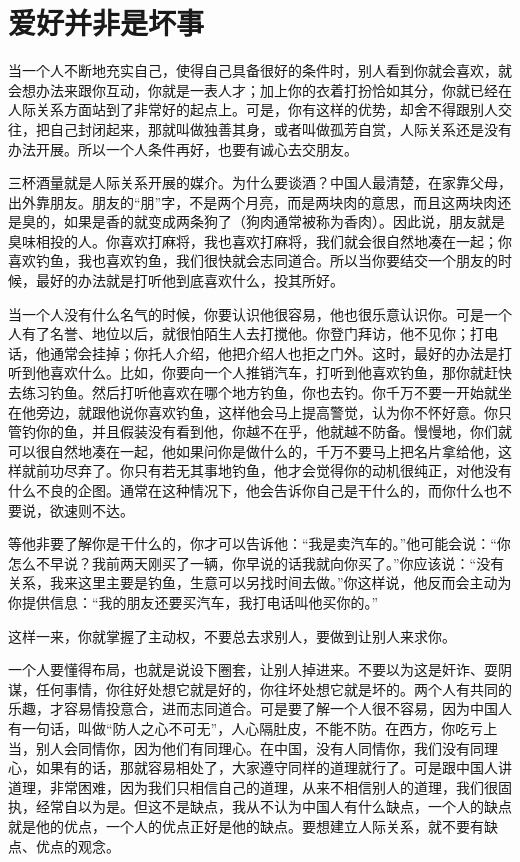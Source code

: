 \documentclass[fontset=fandol, a4paper, 12pt, openright]{ctexbook}
\begin{document}
\section{爱好并非是坏事}

当一个人不断地充实自己，使得自己具备很好的条件时，别人看到你就会喜欢，就会想办法来跟你互动，你就是一表人才；加上你的衣着打扮恰如其分，你就已经在人际关系方面站到了非常好的起点上。可是，你有这样的优势，却舍不得跟别人交往，把自己封闭起来，那就叫做独善其身，或者叫做孤芳自赏，人际关系还是没有办法开展。所以一个人条件再好，也要有诚心去交朋友。

三杯酒量就是人际关系开展的媒介。为什么要谈酒？中国人最清楚，在家靠父母，出外靠朋友。朋友的“朋”字，不是两个月亮，而是两块肉的意思，而且这两块肉还是臭的，如果是香的就变成两条狗了（狗肉通常被称为香肉）。因此说，朋友就是臭味相投的人。你喜欢打麻将，我也喜欢打麻将，我们就会很自然地凑在一起；你喜欢钓鱼，我也喜欢钓鱼，我们很快就会志同道合。所以当你要结交一个朋友的时候，最好的办法就是打听他到底喜欢什么，投其所好。

当一个人没有什么名气的时候，你要认识他很容易，他也很乐意认识你。可是一个人有了名誉、地位以后，就很怕陌生人去打搅他。你登门拜访，他不见你；打电话，他通常会挂掉；你托人介绍，他把介绍人也拒之门外。这时，最好的办法是打听到他喜欢什么。比如，你要向一个人推销汽车，打听到他喜欢钓鱼，那你就赶快去练习钓鱼。然后打听他喜欢在哪个地方钓鱼，你也去钓。你千万不要一开始就坐在他旁边，就跟他说你喜欢钓鱼，这样他会马上提高警觉，认为你不怀好意。你只管钓你的鱼，并且假装没有看到他，你越不在乎，他就越不防备。慢慢地，你们就可以很自然地凑在一起，他如果问你是做什么的，千万不要马上把名片拿给他，这样就前功尽弃了。你只有若无其事地钓鱼，他才会觉得你的动机很纯正，对他没有什么不良的企图。通常在这种情况下，他会告诉你自己是干什么的，而你什么也不要说，欲速则不达。

等他非要了解你是干什么的，你才可以告诉他：“我是卖汽车的。”他可能会说：“你怎么不早说？我前两天刚买了一辆，你早说的话我就向你买了。”你应该说：“没有关系，我来这里主要是钓鱼，生意可以另找时间去做。”你这样说，他反而会主动为你提供信息：“我的朋友还要买汽车，我打电话叫他买你的。”

这样一来，你就掌握了主动权，不要总去求别人，要做到让别人来求你。

一个人要懂得布局，也就是说设下圈套，让别人掉进来。不要以为这是奸诈、耍阴谋，任何事情，你往好处想它就是好的，你往坏处想它就是坏的。两个人有共同的乐趣，才容易情投意合，进而志同道合。可是要了解一个人很不容易，因为中国人有一句话，叫做“防人之心不可无”，人心隔肚皮，不能不防。在西方，你吃亏上当，别人会同情你，因为他们有同理心。在中国，没有人同情你，我们没有同理心，如果有的话，那就容易相处了，大家遵守同样的道理就行了。可是跟中国人讲道理，非常困难，因为我们只相信自己的道理，从来不相信别人的道理，我们很固执，经常自以为是。但这不是缺点，我从不认为中国人有什么缺点，一个人的缺点就是他的优点，一个人的优点正好是他的缺点。要想建立人际关系，就不要有缺点、优点的观念。
\end{document}
